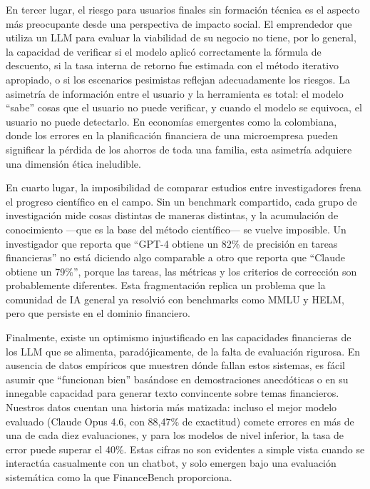 \documentclass[12pt,a4paper]{article}
\begin{document}
En tercer lugar, el riesgo para usuarios finales sin formación técnica es el aspecto más preocupante desde una perspectiva de impacto social. El emprendedor que utiliza un LLM para evaluar la viabilidad de su negocio no tiene, por lo general, la capacidad de verificar si el modelo aplicó correctamente la fórmula de descuento, si la tasa interna de retorno fue estimada con el método iterativo apropiado, o si los escenarios pesimistas reflejan adecuadamente los riesgos. La asimetría de información entre el usuario y la herramienta es total: el modelo ``sabe'' cosas que el usuario no puede verificar, y cuando el modelo se equivoca, el usuario no puede detectarlo. En economías emergentes como la colombiana, donde los errores en la planificación financiera de una microempresa pueden significar la pérdida de los ahorros de toda una familia, esta asimetría adquiere una dimensión ética ineludible.

En cuarto lugar, la imposibilidad de comparar estudios entre investigadores frena el progreso científico en el campo. Sin un benchmark compartido, cada grupo de investigación mide cosas distintas de maneras distintas, y la acumulación de conocimiento ---que es la base del método científico--- se vuelve imposible. Un investigador que reporta que ``GPT-4 obtiene un 82\% de precisión en tareas financieras'' no está diciendo algo comparable a otro que reporta que ``Claude obtiene un 79\%'', porque las tareas, las métricas y los criterios de corrección son probablemente diferentes. Esta fragmentación replica un problema que la comunidad de IA general ya resolvió con benchmarks como MMLU y HELM, pero que persiste en el dominio financiero.

Finalmente, existe un optimismo injustificado en las capacidades financieras de los LLM que se alimenta, paradójicamente, de la falta de evaluación rigurosa. En ausencia de datos empíricos que muestren dónde fallan estos sistemas, es fácil asumir que ``funcionan bien'' basándose en demostraciones anecdóticas o en su innegable capacidad para generar texto convincente sobre temas financieros. Nuestros datos cuentan una historia más matizada: incluso el mejor modelo evaluado (Claude Opus 4.6, con 88,47\% de exactitud) comete errores en más de una de cada diez evaluaciones, y para los modelos de nivel inferior, la tasa de error puede superar el 40\%. Estas cifras no son evidentes a simple vista cuando se interactúa casualmente con un chatbot, y solo emergen bajo una evaluación sistemática como la que FinanceBench proporciona.
\end{document}
